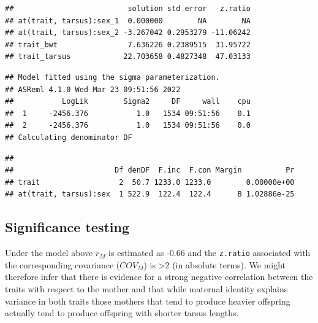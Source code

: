 \documentclass[
  12pt,
]{book}
\newenvironment{Shaded}{\begin{snugshade}}{\end{snugshade}}
\newcommand{\DataTypeTok}[1]{\textcolor[rgb]{0.13,0.29,0.53}{#1}}
\newcommand{\DecValTok}[1]{\textcolor[rgb]{0.00,0.00,0.81}{#1}}
\newcommand{\KeywordTok}[1]{\textcolor[rgb]{0.13,0.29,0.53}{\textbf{#1}}}
\newcommand{\NormalTok}[1]{#1}
\newcommand{\OperatorTok}[1]{\textcolor[rgb]{0.81,0.36,0.00}{\textbf{#1}}}
\newcommand{\OtherTok}[1]{\textcolor[rgb]{0.56,0.35,0.01}{#1}}
\newcommand{\StringTok}[1]{\textcolor[rgb]{0.31,0.60,0.02}{#1}}
\begin{document}
\begin{Shaded}
\end{Shaded}

\begin{verbatim}
##                          solution std error   z.ratio
## at(trait, tarsus):sex_1  0.000000        NA        NA
## at(trait, tarsus):sex_2 -3.267042 0.2953279 -11.06242
## trait_bwt                7.636226 0.2389515  31.95722
## trait_tarsus            22.703658 0.4827348  47.03133
\end{verbatim}

\begin{verbatim}
## Model fitted using the sigma parameterization.
## ASReml 4.1.0 Wed Mar 23 09:51:56 2022
##           LogLik        Sigma2     DF     wall    cpu
##  1     -2456.376           1.0   1534 09:51:56    0.1
##  2     -2456.376           1.0   1534 09:51:56    0.0
## Calculating denominator DF
\end{verbatim}

\begin{verbatim}
## 
##                       Df denDF  F.inc  F.con Margin          Pr
## trait                  2  50.7 1233.0 1233.0        0.00000e+00
## at(trait, tarsus):sex  1 522.9  122.4  122.4      B 1.02886e-25
\end{verbatim}

\hypertarget{significance-testing}{%
\subsection{Significance testing}\label{significance-testing}}

Under the model above \(r_M\) is estimated as -0.66 and the \texttt{z.ratio} associated with the corresponding covariance (\(COV_M\)) is \textgreater2 (in absolute terms). We might therefore infer that there is evidence for a strong negative correlation between the traits with respect to the mother and that while maternal identity explains variance in both traits those mothers that tend to produce heavier offspring actually tend to produce offspring with shorter tarsus lengths.
\end{document}
